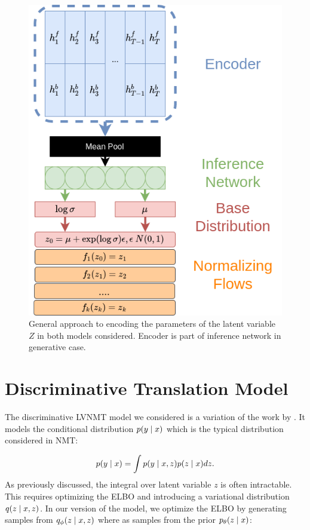 \begin{figure}
	\includegraphics[width=\linewidth]{LatentZEncoding.png}
	\caption{General approach to encoding the parameters of the latent variable $Z$ in both models considered. Encoder is part of inference network in generative case.}
	\label{fig:latentZ}
\end{figure}


\section{Discriminative Translation Model}


The discriminative \ac{LVNMT} model we considered is a variation of the work by \citet{Zhang2016VNMT}. It models the conditional distribution $p(y \; | \;{x})$ which is the typical distribution considered in \ac{NMT}:

\begin{equation}
p(y \; | \;{x})  = \int p(y \; | \;{x,z}) p(z \; | \;{x}) dz.
\end{equation}
As previously discussed, the integral over latent variable $z$ is often intractable. This requires optimizing the \ac{ELBO} and introducing a variational distribution $q(z \; | \;{x,z})$.
In our version of the model, we optimize the \ac{ELBO} by generating samples from $q_{\phi}(z \; | \;{x,z})$ where as \cite{Zhang2016VNMT} samples from the prior $p_{\theta}(z \; | \;{x})$:  %

